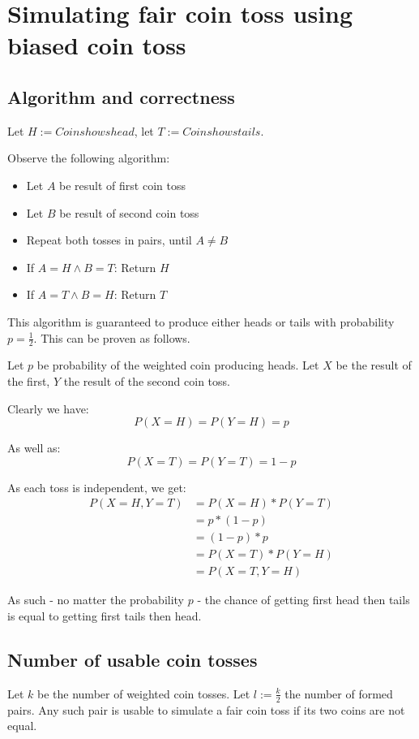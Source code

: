 \documentclass[a4paper]{scrreprt}
\begin{document}
\section{Simulating fair coin toss using biased coin toss}

\subsection{Algorithm and correctness}

Let $H := {Coin shows head}$, let $T := {Coin shows tails}$.

Observe the following algorithm:
\begin{itemize}
	\item Let $A$ be result of first coin toss
	\item Let $B$ be result of second coin toss
	\item Repeat both tosses in pairs, until $A \neq B$
	\item If $A = H \land B = T$: Return $H$
	\item If $A = T \land B = H$: Return $T$
\end{itemize}

This algorithm is guaranteed to produce either heads or tails with probability
$p = \frac{1}{2}$. This can be proven as follows.

Let $p$ be probability of the weighted coin producing heads. Let $X$ be the
result of the first, $Y$ the result of the second coin toss.

Clearly we have:
\[
	P(X=H) = P(Y=H) = p
\]

As well as:
\[
	P(X=T) = P(Y=T) = 1-p
\]

As each toss is independent, we get:
\begin{align*}
	P(X=H, Y=T) & = P(X=H) * P(Y=T) \\
	& = p * (1-p) \\
	& = (1-p) * p \\
	& = P(X=T) * P(Y=H) \\
	& = P(X=T, Y=H)
\end{align*}

As such - no matter the probability $p$ - the chance of getting first head then
tails is equal to getting first tails then head.

\subsection{Number of usable coin tosses}

Let $k$ be the number of weighted coin tosses. Let $l := \frac{k}{2}$ the
number of formed pairs. Any such pair is usable to simulate a fair coin toss if
its two coins are not equal.
\end{document}

